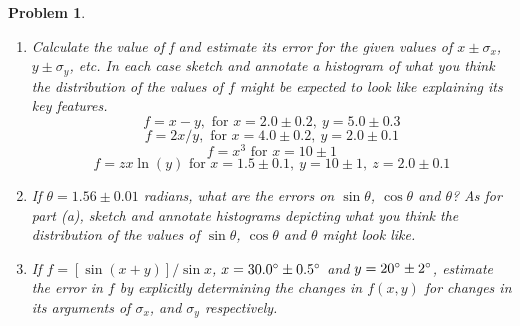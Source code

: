 \documentclass[a4paper]{article}
\theoremstyle{new}
\newtheorem{qns}{Problem}[section]
\begin{document}
\newpage
\begin{qns}\leavevmode
\begin{enumerate}[label=(\alph*)]
\item Calculate the value of f and estimate its error for the given values of $x\pm\sigma_x$, $y\pm\sigma_y$, etc. In each case sketch and annotate a histogram of what you think the distribution of the values of $f$ might be expected to look like explaining its key features.
$$f=x-y,\text{ for }x=2.0\pm0.2,~y=5.0\pm0.3$$
$$f=2x/y,\text{ for }x=4.0\pm0.2,~y=2.0\pm0.1$$
$$f=x^3\text{ for }x=10\pm1$$
$$f=zx\ln(y)\text{ for }x=1.5\pm0.1,~y=10\pm1,~z=2.0\pm0.1$$
\item If $\theta = 1.56\pm0.01$ radians, what are the errors on $\sin\theta$, $\cos\theta$ and $\theta$? As for part (a), sketch and annotate histograms depicting what you think the distribution of the values of $\sin\theta$, $\cos\theta$ and $\theta$ might look like.
\item If $f = [\sin (x + y)] /\sin x$, $x = 30.0\degree \pm 0.5\degree$ and $y = 20\degree \pm 2\degree$, estimate the error in $f$ by explicitly determining the changes in $f(x,y)$ for changes in its arguments of $\sigma_x$, and $\sigma_y$ respectively.
\end{enumerate}
\end{qns}
\end{document}
